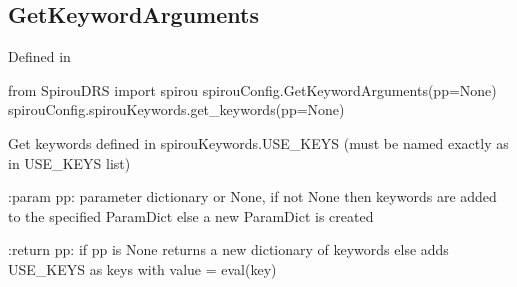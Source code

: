 \begin{minipage}{\textwidth}
\subsection{GetKeywordArguments}

Defined in \spirouConfig{}

\begin{pythonbox}
from SpirouDRS import spirou
spirouConfig.GetKeywordArguments(pp=None)
spirouConfig.spirouKeywords.get_keywords(pp=None)
\end{pythonbox}

\begin{pythondocstring}
Get keywords defined in spirouKeywords.USE_KEYS 
(must be named exactly as in USE_KEYS list)

:param pp: parameter dictionary or None, if not None then keywords are added
           to the specified ParamDict else a new ParamDict is created

:return pp: if pp is None returns a new dictionary of keywords
            else adds USE_KEYS as keys with value = eval(key)
\end{pythondocstring}
\end{minipage}

